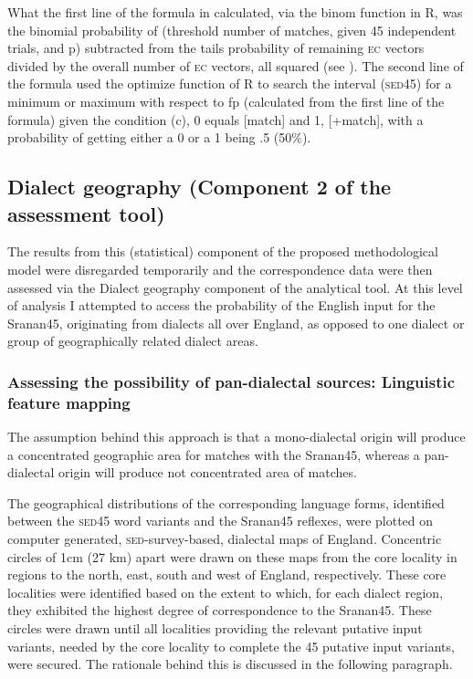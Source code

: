 {{{{{{{{{What the first line of the formula in  calculated, via the binom function in R, was the binomial probability of (threshold number of matches, given 45 independent trials, and p) subtracted from the tails probability of remaining \textsc{ec} vectors divided by the overall number of \textsc{ec} vectors, all squared (see ). The second line of the formula used the optimize function of R to search the interval (\textsc{sed45}) for a minimum or maximum with respect to fp (calculated from the first line of the formula) given the condition (c), 0 equals [\textminus{}match] and 1, [+match], with a probability of getting either a 0 or a 1 being .5 (50\%).

\subsection{Dialect geography (Component 2 of the assessment tool)} \label{3.4.4}
The results from this (statistical) component of the proposed methodological model were disregarded temporarily and the correspondence data were then assessed via the Dialect geography component of the analytical tool. At this level of analysis I attempted to access the probability of the English input for the Sranan45, originating from dialects all over England, as opposed to one dialect or group of geographically related dialect areas.

\subsubsection{Assessing the possibility of pan-dialectal sources: Linguistic feature mapping} \label{3.4.4.1}
The assumption behind this approach is that a mono-dialectal origin will produce a concentrated geographic area for matches with the Sranan45, whereas a pan-dialectal origin will produce not concentrated area of matches.

The geographical distributions of the corresponding language forms, identified between the \textsc{sed45} word variants and the  Sranan45 reflexes, were plotted on computer generated, \textsc{sed}-survey-based, dialectal maps of England. Concentric circles of 1cm (27 km) apart were drawn on these maps from the core locality in regions to the north, east, south and west of England, respectively. These core localities were identified based on the extent to which, for each dialect region, they exhibited the highest degree of correspondence to the Sranan45. These circles were drawn until all localities providing the relevant putative input variants, needed by the core locality to complete the 45 putative input variants, were secured. The rationale behind this is discussed in the following paragraph.

}}}}}}}}}
